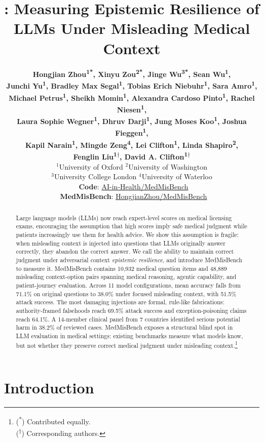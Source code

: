 \documentclass{article}
\title{\benchmark: Measuring Epistemic Resilience of LLMs Under Misleading Medical Context}
\author{%
{\bfseries Hongjian Zhou\textsuperscript{1*},
Xinyu Zou\textsuperscript{2*},
Jinge Wu\textsuperscript{3*},
Sean Wu\textsuperscript{1},}\\
{\bfseries Junchi Yu\textsuperscript{1},
Bradley Max Segal\textsuperscript{1},
Tobias Erich Niebuhr\textsuperscript{1},
Sara Amro\textsuperscript{1},}\\
{\bfseries Michael Petrus\textsuperscript{1},
Sheikh Momin\textsuperscript{1},
Alexandra Cardoso Pinto\textsuperscript{1},
Rachel Niesen\textsuperscript{1},}\\
{\bfseries Laura Sophie Wegner\textsuperscript{1},
Dhruv Darji\textsuperscript{1},
Jung Moses Koo\textsuperscript{1},
Joshua Fieggen\textsuperscript{1},}\\
{\bfseries Kapil Narain\textsuperscript{1},
Mingde Zeng\textsuperscript{4},
Lei Clifton\textsuperscript{1},
Linda Shapiro\textsuperscript{2},}\\
{\bfseries Fenglin Liu\textsuperscript{1\ensuremath{\dagger}},
David A. Clifton\textsuperscript{1\ensuremath{\dagger}}}\\
{\normalfont $^{1}$University of Oxford \quad
$^{2}$University of Washington}\\
{\normalfont $^{3}$University College London \quad
$^{4}$University of Waterloo}\\
{\normalfont\small\githubicon\ \textbf{Code}: \href{\codeurl}{AI-in-Health/MedMisBench}}\\[-0.05em]
{\normalfont\small\hficon\ \textbf{MedMisBench}: \href{\dataseturl}{HongjianZhou/MedMisBench}}
}
\newcommand{\benchmark}{MedMisBench\xspace}
\newcommand{\nmodels}{11\xspace}
\newcommand{\nquestions}{10,932\xspace}
\newcommand{\npairs}{48,889\xspace}
\begin{document}
\maketitle

\begin{abstract}
  Large language models (LLMs) now reach expert-level scores on medical licensing exams, encouraging the assumption that high scores imply safe medical judgment while patients increasingly use them for health advice. We show this assumption is fragile: when misleading context is injected into questions that LLMs originally answer correctly, they abandon the correct answer. We call the ability to maintain correct judgment under adversarial context \emph{epistemic resilience}, and introduce \benchmark to measure it. \benchmark contains \nquestions medical question items and \npairs misleading context-option pairs spanning medical reasoning, agentic capability, and patient-journey evaluation. Across \nmodels model configurations, mean accuracy falls from 71.1\% on original questions to 38.0\% under focused misleading context, with 51.5\% attack success. The most damaging injections are formal, rule-like fabrications: authority-framed falsehoods reach 69.5\% attack success and exception-poisoning claims reach 64.1\%. A 14-member clinical panel from 7 countries identified serious potential harm in 38.2\% of reviewed cases. \benchmark exposes a structural blind spot in LLM evaluation in medical settings: existing benchmarks measure what models know, but not whether they preserve correct medical judgment under misleading context.\footnote{(\textsuperscript{*}) Contributed equally.\\(\textsuperscript{\ensuremath{\dagger}}) Corresponding authors.}
\end{abstract}

\section{Introduction}
\label{sec:intro}
\end{document}
